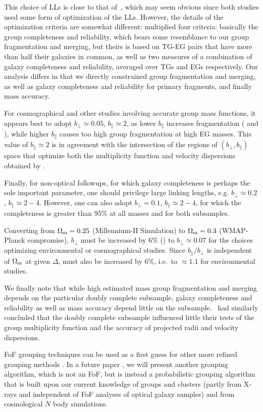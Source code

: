 This choice of LLs is close to that of~\cite{Robotham+11}, which may seem
obvious since both studies used some form of optimization of the LLs. However,
the details of the optimization criteria are somewhat different:
\citeauthor{Robotham+11} multiplied four criteria: basically the group
completeness and reliability, which bears some resemblance to our group
fragmentation and merging, but theirs is based on TG-EG pairs that have more
than half their galaxies in common, as well as two measures of a combination of
galaxy completeness and reliability, averaged over TGs and EGs respectively.
Our analysis differs in that we directly constrained group fragmentation and
merging, as well as galaxy completeness and reliability for primary fragments,
and finally mass accuracy.

For cosmographical and other studies involving accurate group mass functions,
it appears best to adopt $b_\perp \simeq 0.05$, $b_\parallel \simeq 2$, as
lower $b_\parallel$ increases fragmentation
( and ),
while higher $b_\parallel$ causes too high group fragmentation at high EG
masses. This value of $b_\parallel\simeq 2$ is in agreement with the
intersection of the regions of $(b_\perp,b_\parallel)$ space  that optimize
both the multiplicity function  and velocity dispersions obtained by
\cite{Berlind+06}.

Finally, for non-optical followups, for which galaxy completeness is perhaps
the sole important parameter, one should privilege large linking lengths, e.g.
$b_\perp \simeq 0.2$, $b_\parallel \simeq 2-4$. However, one can also adopt
$b_\perp = 0.1$, $b_\parallel \simeq 2-4$, for which the completeness is
greater than 95\% at all masses and for both subsamples.

Converting from $\Omega_{\rm m} = 0.25$ (Millennium-II Simulation) to
$\Omega_{\rm m} = 0.3$ (WMAP-Planck compromise), $b_\perp$ must be increased by
6\% () to $b_\perp \simeq 0.07$ for the choices
optimizing environmental or cosmographical studies. Since $b_\parallel/b_\perp$
is independent of $\Omega_{\rm m}$ at given $\Delta$, \bpar{} must also be
increased by 6\%, i.e.\ to \bpar$\approx1.1$ for environmental studies.

We finally note that while high estimated mass group fragmentation  and merging
depends on the particular doubly complete subsample, galaxy completeness and
reliability as well as mass accuracy depend little on the
subsample.~\cite{Berlind+06} had similarly concluded that the doubly complete
subsample influenced little their tests of the group multiplicity function and
the accuracy of projected radii and velocity dispersions.

FoF grouping techniques can be used as a first guess for other more refined
grouping methods \citep{YMvdBJ05,Yang+07}. In a future paper \citep{DM14b}, we
will present another grouping algorithm, which is not an FoF, but is instead a
probabilistic grouping algorithm that is built upon our current knowledge of
groups and clusters (partly from X-rays and independent of FoF analyses of
optical galaxy samples) and from cosmological $N$ body simulations.

